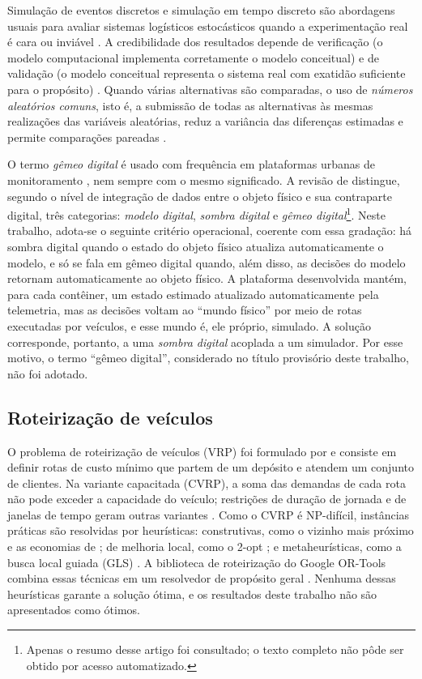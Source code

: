 Simulação de eventos discretos e simulação em tempo discreto são abordagens
usuais para avaliar sistemas logísticos estocásticos quando a experimentação
real é cara ou inviável \cite{law2024simulation}. A credibilidade dos
resultados depende de verificação (o modelo computacional implementa
corretamente o modelo conceitual) e de validação (o modelo conceitual
representa o sistema real com exatidão suficiente para o propósito)
\cite{sargent2013verification}. Quando várias alternativas são comparadas, o
uso de \emph{números aleatórios comuns}, isto é, a submissão de todas as
alternativas às mesmas realizações das variáveis aleatórias, reduz a
variância das diferenças estimadas e permite comparações pareadas
\cite{glasserman1992some}.

O termo \emph{gêmeo digital} é usado com frequência em plataformas urbanas de
monitoramento \cite{barth2023data,cardenasleon2024urban}, nem sempre com o
mesmo significado. A revisão de \cite{kritzinger2018digital} distingue, segundo
o nível de integração de dados entre o objeto físico e sua contraparte digital,
três categorias: \emph{modelo digital}, \emph{sombra digital} e \emph{gêmeo
digital}\footnote{Apenas o resumo desse artigo foi consultado; o texto completo
não pôde ser obtido por acesso automatizado.}. Neste trabalho, adota-se o
seguinte critério operacional, coerente com essa gradação: há sombra digital
quando o estado do objeto físico atualiza automaticamente o modelo, e só se
fala em gêmeo digital quando, além disso, as decisões do modelo retornam
automaticamente ao objeto físico. A plataforma desenvolvida mantém, para cada
contêiner, um estado estimado atualizado automaticamente pela telemetria, mas
as decisões voltam ao ``mundo físico'' por meio de rotas executadas por
veículos, e esse mundo é, ele próprio, simulado. A solução corresponde,
portanto, a uma \emph{sombra digital} acoplada a um simulador. Por esse motivo,
o termo ``gêmeo digital'', considerado no título provisório deste trabalho, não
foi adotado.

\subsection{Roteirização de veículos}

O problema de roteirização de veículos (VRP) foi formulado por
\cite{dantzig1959truck} e consiste em definir rotas de custo mínimo que partem
de um depósito e atendem um conjunto de clientes. Na variante capacitada
(CVRP), a soma das demandas de cada rota não pode exceder a capacidade do
veículo; restrições de duração de jornada e de janelas de tempo geram outras
variantes \cite{toth2014vehicle}. Como o CVRP é NP-difícil, instâncias
práticas são resolvidas por heurísticas: construtivas, como o vizinho mais
próximo \cite{rosenkrantz1977analysis} e as economias de
\cite{clarke1964scheduling}; de melhoria local, como o 2-opt
\cite{croes1958method}; e metaheurísticas, como a busca local guiada (GLS)
\cite{voudouris1999guided}. A biblioteca de roteirização do Google OR-Tools
combina essas técnicas em um resolvedor de propósito geral
\cite{furnon2025ortools,perron2025ortools}. Nenhuma dessas heurísticas garante
a solução ótima, e os resultados deste trabalho não são apresentados como
ótimos.

